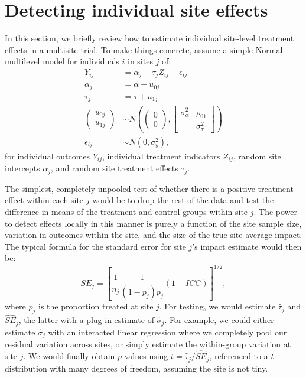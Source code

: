 \documentclass[]{article}
\begin{document}
\section{Detecting individual site effects}

In this section, we briefly review how to estimate individual site-level treatment effects in a multisite trial.
To make things concrete, assume a simple Normal multilevel model for individuals $i$ in sites $j$ of: 
\begin{align*}
	Y_{ij} &= \alpha_j + \tau_j Z_{ij} + \epsilon_{ij} \\
	\alpha_j &= \alpha + u_{0j} \\
	\tau_j &= \tau + u_{1j} \\
	\begin{pmatrix}
		u_{0j} \\ u_{1j}
	\end{pmatrix} &\sim N\left(
	\begin{pmatrix}
		0 \\ 0
	\end{pmatrix}, 
	\begin{bmatrix}
		\sigma^2_\alpha & \rho_{01} \\  & \sigma^2_\tau
	\end{bmatrix}\right) \\
	\epsilon_{ij} &\sim N(0, \sigma^2_y) ,
\end{align*}
for individual outcomes $Y_{ij}$, individual treatment indicators $Z_{ij}$, random site intercepts $\alpha_j$, and random site treatment effects $\tau_j$.

The simplest, completely unpooled test of whether there is a positive treatment effect within each site $j$ would be to drop the rest of the data and test the difference in means of the treatment and control groups within site $j$.
The power to detect effects locally in this manner is purely a function of the site sample size, variation in outcomes within the site, and the size of the true site average impact.
The typical formula for the standard error for site $j$'s impact estimate would then be:
$$ SE_j = \left[ \frac{1}{n_j} \frac{1}{(1-p_j)p_j} (1-ICC) \right]^{1/2} , $$ 
where $p_j$ is the proportion treated at site $j$.
For testing, we would estimate $\hat{\tau}_j$ and $\widehat{SE}_j$, the latter with a plug-in estimate of $\hat{\sigma}_j$.
For example, we could either estimate $\hat{\sigma}_j$ with an interacted linear regression where we completely pool our residual variation across sites, or simply estimate the within-group variation at site $j$.
We would finally obtain $p$-values using $t = \hat{\tau}_j / \widehat{SE}_j$, referenced to a $t$ distribution with many degrees of freedom, assuming the site is not tiny.
\end{document}
